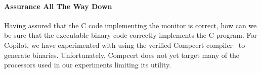 \paragraph{Assurance All The Way Down} 
Having assured that the C code implementing the monitor is correct,
how can we be sure that the executable binary code correctly
implements the C program. For Copilot, we have experimented
with using the verified Compcert compiler~\cite{leroy} to generate
binaries.  Unfortunately, Compcert does not yet target many of the
processors used in our experiments limiting its utility.




